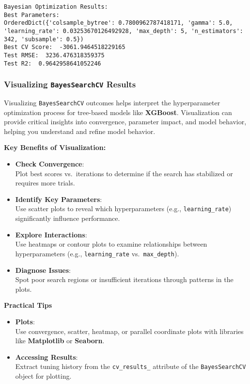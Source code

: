 \documentclass[
  letterpaper,
  DIV=11,
  numbers=noendperiod]{scrreprt}
\begin{document}
\begin{verbatim}
Bayesian Optimization Results: 
Best Parameters: 
OrderedDict({'colsample_bytree': 0.7800962787418171, 'gamma': 5.0, 'learning_rate': 0.03253670126492928, 'max_depth': 5, 'n_estimators': 342, 'subsample': 0.5})
Best CV Score:  -3061.9464518229165
Test RMSE:  3236.476318359375
Test R2:  0.9642958641052246
\end{verbatim}

\subsubsection{\texorpdfstring{Visualizing \texttt{BayesSearchCV}
Results}{Visualizing BayesSearchCV Results}}\label{visualizing-bayessearchcv-results}

Visualizing \texttt{BayesSearchCV} outcomes helps interpret the
hyperparameter optimization process for tree-based models like
\textbf{XGBoost}. Visualization can provide critical insights into
convergence, parameter impact, and model behavior, helping you
understand and refine model behavior.

\textbf{Key Benefits of Visualization:}

\begin{itemize}
\item
  \textbf{Check Convergence}:\\
  Plot best scores vs.~iterations to determine if the search has
  stabilized or requires more trials.
\item
  \textbf{Identify Key Parameters}:\\
  Use scatter plots to reveal which hyperparameters (e.g.,
  \texttt{learning\_rate}) significantly influence performance.
\item
  \textbf{Explore Interactions}:\\
  Use heatmaps or contour plots to examine relationships between
  hyperparameters (e.g., \texttt{learning\_rate}
  vs.~\texttt{max\_depth}).
\item
  \textbf{Diagnose Issues}:\\
  Spot poor search regions or insufficient iterations through patterns
  in the plots.
\end{itemize}

\textbf{Practical Tips}

\begin{itemize}
\item
  \textbf{Plots}:\\
  Use convergence, scatter, heatmap, or parallel coordinate plots with
  libraries like \textbf{Matplotlib} or \textbf{Seaborn}.
\item
  \textbf{Accessing Results}:\\
  Extract tuning history from the \texttt{cv\_results\_} attribute of
  the \texttt{BayesSearchCV} object for plotting.
\end{itemize}
\end{document}
